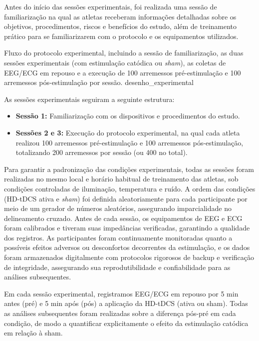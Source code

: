 Antes do início das sessões experimentais, foi realizada uma sessão de familiarização na qual as atletas receberam informações detalhadas sobre os objetivos, procedimentos, riscos e benefícios do estudo, além de treinamento prático para se familiarizarem com o protocolo e os equipamentos utilizados.

{Fluxo do protocolo experimental, incluindo a sessão de familiarização, as duas sessões experimentais (com estimulação catódica ou \textit{sham}), as coletas de EEG/ECG em repouso e a execução de 100 arremessos pré-estimulação e 100 arremessos pós-estimulação por sessão.}
{desenho_experimental}

As sessões experimentais seguiram a seguinte estrutura:
\begin{itemize}
    \item \textbf{Sessão 1:} Familiarização com os dispositivos e procedimentos do estudo.
    \item \textbf{Sessões 2 e 3:} Execução do protocolo experimental, na qual cada atleta realizou 100 arremessos pré-estimulação e 100 arremessos pós-estimulação, totalizando 200 arremessos por sessão (ou 400 no total).
\end{itemize}

Para garantir a padronização das condições experimentais, todas as sessões foram realizadas no mesmo local e horário habitual de treinamento das atletas, sob condições controladas de iluminação, temperatura e ruído. A ordem das condições (HD-tDCS ativa e \textit{sham}) foi definida aleatoriamente para cada participante por meio de um gerador de números aleatórios, assegurando imparcialidade no delineamento cruzado. Antes de cada sessão, os equipamentos de EEG e ECG foram calibrados e tiveram suas impedâncias verificadas, garantindo a qualidade dos registros. As participantes foram continuamente monitoradas quanto a possíveis efeitos adversos ou desconfortos decorrentes da estimulação, e os dados foram armazenados digitalmente com protocolos rigorosos de backup e verificação de integridade, assegurando sua reprodutibilidade e confiabilidade para as análises subsequentes.

Em cada sessão experimental, registramos EEG/ECG em repouso por 5 min antes (pré) e 5 min após (pós) a aplicação da HD-tDCS (ativa ou sham). Todas as análises subsequentes foram realizadas sobre a diferença pós-pré em cada condição, de modo a quantificar explicitamente o efeito da estimulação catódica em relação à sham.

